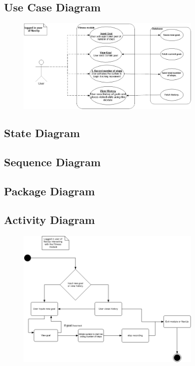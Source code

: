 \subsection{Use Case Diagram}
\begin{figure}[!htbp]
  \includegraphics[width=0.8\textwidth]{Fitness/FitnessUseCase.png}
\end{figure}

\subsection{State Diagram}

\subsection{Sequence Diagram}

\subsection{Package Diagram}

\subsection{Activity Diagram}
\begin{figure}[!htbp]
  \includegraphics[width=0.8\textwidth]{Fitness/FitnessActivitydiagram.png}
\end{figure}

